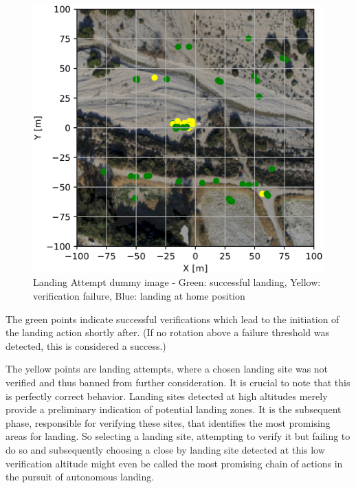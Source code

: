 \begin{figure}[h]
    \begin{center}
        \includegraphics[scale=0.25]{images/evaluation/landings_random_WP_GT.png}
        \caption{Landing Attempt dummy image - Green: successful landing, Yellow: verification failure, Blue: landing at home position}
        \label{fig:landing_attempts_dummy}
    \end{center}
\end{figure}

The green points indicate successful verifications which lead to the initiation of the landing action shortly after. (If no rotation above a failure threshold was detected, this is considered a success.) 

The yellow points are landing attempts, where a chosen landing site was not verified and thus banned from further consideration. It is crucial to note that this is perfectly correct behavior. Landing sites detected at high altitudes merely provide a preliminary indication of potential landing zones.  It is the subsequent phase, responsible for verifying these sites, that identifies the most promising areas for landing. So selecting a landing site, attempting to verify it but failing to do so and subsequently choosing a close by landing site detected at this low verification altitude might even be called the most promising chain of actions in the pursuit of autonomous landing.

